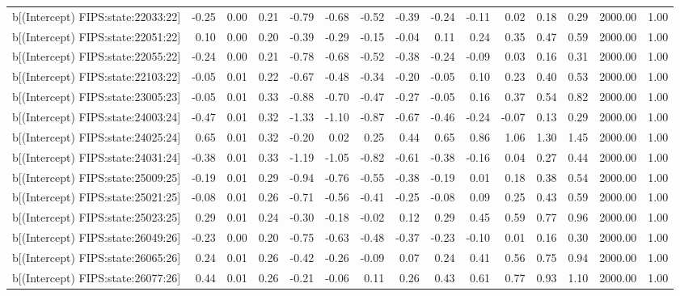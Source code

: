 \begin{table}[ht]
\begin{tabular}{rrrrrrrrrrrrrrr}
  b[(Intercept) FIPS:state:22033:22] & -0.25 & 0.00 & 0.21 & -0.79 & -0.68 & -0.52 & -0.39 & -0.24 & -0.11 & 0.02 & 0.18 & 0.29 & 2000.00 & 1.00 \\ 
  b[(Intercept) FIPS:state:22051:22] & 0.10 & 0.00 & 0.20 & -0.39 & -0.29 & -0.15 & -0.04 & 0.11 & 0.24 & 0.35 & 0.47 & 0.59 & 2000.00 & 1.00 \\ 
  b[(Intercept) FIPS:state:22055:22] & -0.24 & 0.00 & 0.21 & -0.78 & -0.68 & -0.52 & -0.38 & -0.24 & -0.09 & 0.03 & 0.16 & 0.31 & 2000.00 & 1.00 \\ 
  b[(Intercept) FIPS:state:22103:22] & -0.05 & 0.01 & 0.22 & -0.67 & -0.48 & -0.34 & -0.20 & -0.05 & 0.10 & 0.23 & 0.40 & 0.53 & 2000.00 & 1.00 \\ 
  b[(Intercept) FIPS:state:23005:23] & -0.05 & 0.01 & 0.33 & -0.88 & -0.70 & -0.47 & -0.27 & -0.05 & 0.16 & 0.37 & 0.54 & 0.82 & 2000.00 & 1.00 \\ 
  b[(Intercept) FIPS:state:24003:24] & -0.47 & 0.01 & 0.32 & -1.33 & -1.10 & -0.87 & -0.67 & -0.46 & -0.24 & -0.07 & 0.13 & 0.29 & 2000.00 & 1.00 \\ 
  b[(Intercept) FIPS:state:24025:24] & 0.65 & 0.01 & 0.32 & -0.20 & 0.02 & 0.25 & 0.44 & 0.65 & 0.86 & 1.06 & 1.30 & 1.45 & 2000.00 & 1.00 \\ 
  b[(Intercept) FIPS:state:24031:24] & -0.38 & 0.01 & 0.33 & -1.19 & -1.05 & -0.82 & -0.61 & -0.38 & -0.16 & 0.04 & 0.27 & 0.44 & 2000.00 & 1.00 \\ 
  b[(Intercept) FIPS:state:25009:25] & -0.19 & 0.01 & 0.29 & -0.94 & -0.76 & -0.55 & -0.38 & -0.19 & 0.01 & 0.18 & 0.38 & 0.54 & 2000.00 & 1.00 \\ 
  b[(Intercept) FIPS:state:25021:25] & -0.08 & 0.01 & 0.26 & -0.71 & -0.56 & -0.41 & -0.25 & -0.08 & 0.09 & 0.25 & 0.43 & 0.59 & 2000.00 & 1.00 \\ 
  b[(Intercept) FIPS:state:25023:25] & 0.29 & 0.01 & 0.24 & -0.30 & -0.18 & -0.02 & 0.12 & 0.29 & 0.45 & 0.59 & 0.77 & 0.96 & 2000.00 & 1.00 \\ 
  b[(Intercept) FIPS:state:26049:26] & -0.23 & 0.00 & 0.20 & -0.75 & -0.63 & -0.48 & -0.37 & -0.23 & -0.10 & 0.01 & 0.16 & 0.30 & 2000.00 & 1.00 \\ 
  b[(Intercept) FIPS:state:26065:26] & 0.24 & 0.01 & 0.26 & -0.42 & -0.26 & -0.09 & 0.07 & 0.24 & 0.41 & 0.56 & 0.75 & 0.94 & 2000.00 & 1.00 \\ 
  b[(Intercept) FIPS:state:26077:26] & 0.44 & 0.01 & 0.26 & -0.21 & -0.06 & 0.11 & 0.26 & 0.43 & 0.61 & 0.77 & 0.93 & 1.10 & 2000.00 & 1.00 \\ 

\end{tabular}
\end{table}
